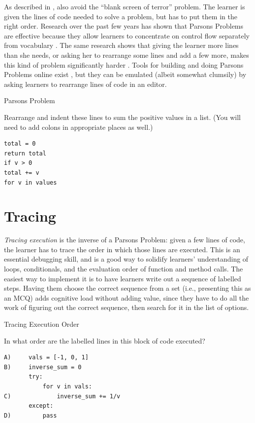 As described in ,  also avoid the ``blank screen of terror'' problem.  The
learner is given the lines of code needed to solve a problem, but has
to put them in the right order. Research over the past few years has
shown that Parsons Problems are effective because they allow learners
to concentrate on control flow separately from vocabulary
\cite{Pars2006,Eric2015,Morr2016,Eric2017}. The same research shows
that giving the learner more lines than she needs, or asking her to
rearrange some lines and add a few more, makes this kind of problem
significantly harder \cite{Harm2016}.  Tools for building and doing
Parsons Problems online exist \cite{Ihan2011}, but they can be
emulated (albeit somewhat clumsily) by asking learners to rearrange
lines of code in an editor.

\begin{callout}{Parsons Problem}

  Rearrange and indent these lines to sum the positive values in a
  list.  (You will need to add colons in appropriate places as well.)

\begin{verbatim}
total = 0
return total
if v > 0
total += v
for v in values
\end{verbatim}

\end{callout}

\section{Tracing}\label{s:exercises-tracing}

\emph{Tracing execution} is the inverse of a Parsons Problem: given a
few lines of code, the learner has to trace the order in which those
lines are executed. This is an essential debugging skill, and is a
good way to solidify learners' understanding of loops, conditionals,
and the evaluation order of function and method calls. The easiest way
to implement it is to have learners write out a sequence of labelled
steps.  Having them choose the correct sequence from a set (i.e.,
presenting this as an MCQ) adds cognitive load without adding value,
since they have to do all the work of figuring out the correct
sequence, then search for it in the list of options.

\begin{callout}{Tracing Execution Order}

  In what order are the labelled lines in this block of code executed?

\begin{verbatim}
A)     vals = [-1, 0, 1]
B)     inverse_sum = 0
       try:
           for v in vals:
C)             inverse_sum += 1/v
       except:
D)         pass
\end{verbatim}

\end{callout}

